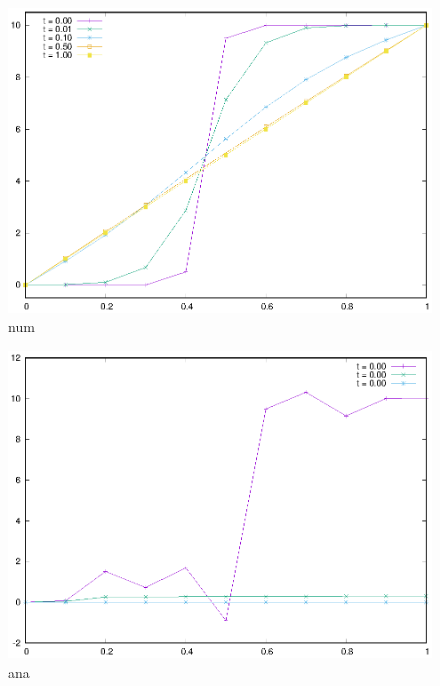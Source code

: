 \documentclass[10pt,a4j,dvipdfmx]{jarticle}
\begin{document}
\begin{figure}[htbp]
\centering
 \includegraphics[width=13cm]{g2=10,steady_num.eps}
 \caption{num}
\end{figure}
\begin{figure}[htbp]
\centering
 \includegraphics[width=12cm]{g2=10,steady_ana.eps}
 \caption{ana}
\end{figure}
\end{document}

